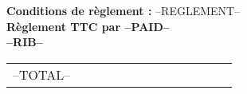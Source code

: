 \documentclass[a4paper, oneside, 10pt, french]{article}
\newcommand{\ghline}{\arrayrulecolor{gray}\hline\arrayrulecolor{black}}
\begin{document}
\begin{minipage}[t]{0.48\textwidth}
{\footnotesize \textbf{Conditions de règlement :} --REGLEMENT--}\\
\textbf{{\footnotesize Règlement TTC par --PAID--\\
--RIB--
} }\\
\end{minipage}
\hspace{2mm}
\begin{minipage}[t]{0.50\textwidth}
\begin{flushright}
\begin{tabular}{p{4.5cm} r}
--TOTAL--
\rowcolor{chaumeil-violet}\textcolor{white}{NET à payer} &\textcolor{white}{--APAYER--} \\ 
\end{tabular} 
\end{flushright}
\end{minipage}

\newpage
\end{document}

